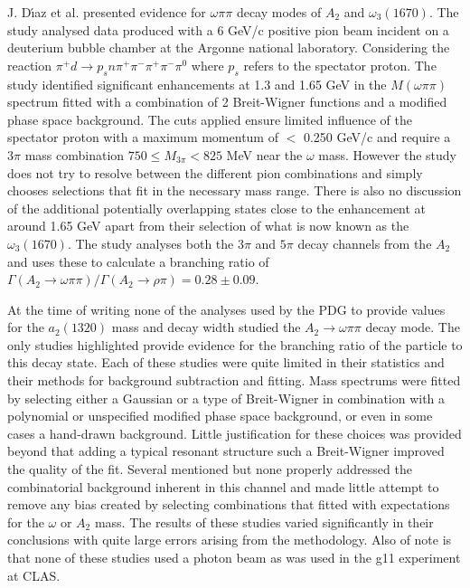J. D\'{\i}az et al.\cite{diaz1974evidence} presented evidence for $\omega\pi\pi$ decay modes of $A_2$ and $\omega_{3}(1670)$. The study analysed data produced with a 6 GeV/c positive pion beam incident on a deuterium bubble chamber at the Argonne national laboratory. Considering the reaction $\pi^{+}d \rightarrow p_{s}n\pi^+\pi^-\pi^+\pi^-\pi^0$ where $p_s$ refers to the spectator proton. The study identified significant enhancements at 1.3 and 1.65 GeV in the $M(\omega\pi\pi)$ spectrum fitted with a combination of 2 Breit-Wigner functions and a modified phase space background. The cuts applied ensure limited influence of the spectator proton with a maximum momentum of $<$ 0.250 GeV/c and require a $3\pi$ mass combination $750\le M_{3\pi} < 825$ MeV near the $\omega$ mass. However the study does not try to resolve between the different pion combinations and simply chooses selections that fit in the necessary mass range. There is also no discussion of the additional potentially overlapping states close to the enhancement at around 1.65 GeV apart from their selection of what is now known as the $\omega_{3}(1670)$. The study analyses both the $3\pi$ and $5\pi$ decay channels from the $A_2$ and uses these to calculate a branching ratio of $\Gamma(A_{2}\rightarrow\omega\pi\pi)/\Gamma(A_{2}\rightarrow\rho\pi)=0.28\pm0.09$.

At the time of writing none of the analyses used by the PDG to provide values for the $a_{2}(1320)$ mass and decay width studied the $A_{2}\rightarrow\omega\pi\pi$ decay mode. The only studies highlighted provide evidence for the branching ratio of the particle to this decay state. Each of these studies were quite limited in their statistics and their methods for background subtraction and fitting. Mass spectrums were fitted by selecting either a Gaussian or a type of Breit-Wigner in combination with a polynomial or unspecified modified phase space background, or even in some cases a hand-drawn background. Little justification for these choices was provided beyond that adding a typical resonant structure such a Breit-Wigner improved the quality of the fit. Several mentioned but none properly addressed the combinatorial background inherent in this channel and made little attempt to remove any bias created by selecting combinations that fitted with expectations for the $\omega$ or $A_2$ mass. The results of these studies varied significantly in their conclusions with quite large errors arising from the methodology. Also of note is that none of these studies used a photon beam as was used in the g11 experiment at CLAS.







